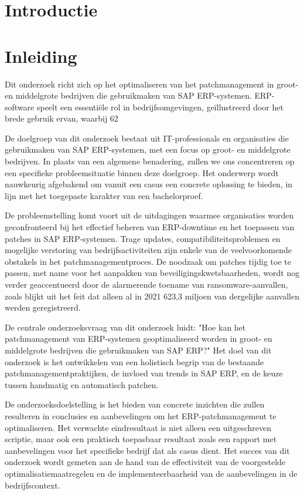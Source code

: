 
\section{Introductie}%
\label{sec:introductie}
\section{Inleiding}

Dit onderzoek richt zich op het optimaliseren van het patchmanagement in groot- en middelgrote bedrijven die gebruikmaken van SAP ERP-systemen. ERP-software speelt een essentiële rol in bedrijfsomgevingen, geïllustreerd door het brede gebruik ervan, waarbij 62%

De doelgroep van dit onderzoek bestaat uit IT-professionals en organisaties die gebruikmaken van SAP ERP-systemen, met een focus op groot- en middelgrote bedrijven. In plaats van een algemene benadering, zullen we ons concentreren op een specifieke probleemsituatie binnen deze doelgroep. Het onderwerp wordt nauwkeurig afgebakend om vanuit een casus een concrete oplossing te bieden, in lijn met het toegepaste karakter van een bachelorproef.

De probleemstelling komt voort uit de uitdagingen waarmee organisaties worden geconfronteerd bij het effectief beheren van ERP-downtime en het toepassen van patches in SAP ERP-systemen. Trage updates, compatibiliteitsproblemen en mogelijke verstoring van bedrijfsactiviteiten zijn enkele van de veelvoorkomende obstakels in het patchmanagementproces. De noodzaak om patches tijdig toe te passen, met name voor het aanpakken van beveiligingskwetsbaarheden, wordt nog verder geaccentueerd door de alarmerende toename van ransomware-aanvallen, zoals blijkt uit het feit dat alleen al in 2021 623,3 miljoen van dergelijke aanvallen werden geregistreerd.

De centrale onderzoeksvraag van dit onderzoek luidt: "Hoe kan het patchmanagement van ERP-systemen geoptimaliseerd worden in groot- en middelgrote bedrijven die gebruikmaken van SAP ERP?" Het doel van dit onderzoek is het ontwikkelen van een holistisch begrip van de bestaande patchmanagementpraktijken, de invloed van trends in SAP ERP, en de keuze tussen handmatig en automatisch patchen. 

De onderzoeksdoelstelling is het bieden van concrete inzichten die zullen resulteren in conclusies en aanbevelingen om het ERP-patchmanagement te optimaliseren. Het verwachte eindresultaat is niet alleen een uitgeschreven scriptie, maar ook een praktisch toepasbaar resultaat zoals een rapport met aanbevelingen voor het specifieke bedrijf dat als casus dient. Het succes van dit onderzoek wordt gemeten aan de hand van de effectiviteit van de voorgestelde optimalisatiemaatregelen en de implementeerbaarheid van de aanbevelingen in de bedrijfscontext.

